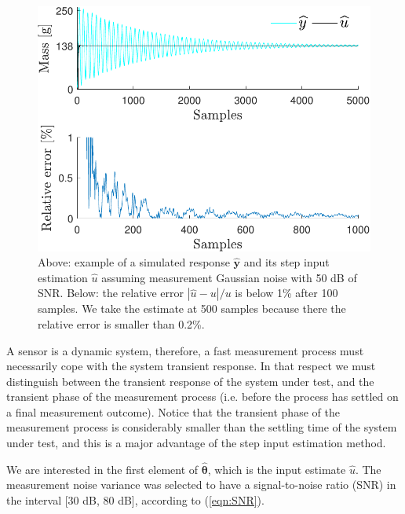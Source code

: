 \begin{figure}[!htb]
\centering
\includegraphics[width=0.69\columnwidth]{./ChapterExperimentalValidation/fig/Fig_1.pdf} 
\caption{ \label{fig:uh_sim} 
Above: example of a simulated response $\widehat{\mathbf{y}}$ and its step input estimation $\widehat{u}$ assuming measurement Gaussian noise with 50 dB of SNR. 
Below: the relative error $|\widehat{u} - u| / u$ is below 1\% after 100 samples. 
We take the estimate at 500 samples because there the relative error is smaller than 0.2\%.  }
\end{figure}

A sensor is a dynamic system, therefore, a fast measurement process must necessarily cope with the system transient response. In that respect we must distinguish between the transient response of the system under test, and the transient phase of the measurement process (i.e. before the process has settled on a final measurement outcome). Notice that the transient phase of the measurement process is considerably smaller than the settling time of the system under test, and this is a major advantage of the step input estimation method.

We are interested in the first element of $\widehat{\bm{\theta}}$, which is the input estimate $\widehat{u}$.
The measurement noise variance was selected to have a signal-to-noise ratio (SNR) in the interval [30 dB, 80 dB], according to \color{blue}(\ref{eqn:SNR})\color{black}. 

